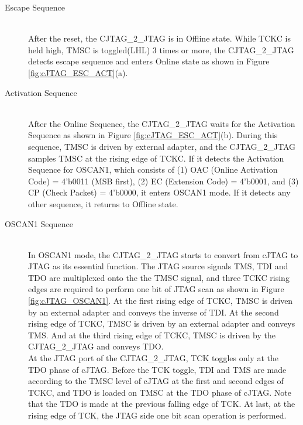 \begin{description}

    \item[Escape Sequence]\mbox{}\\
        After the reset, the CJTAG\_2\_JTAG is in Offline state. While TCKC is held high, TMSC is toggled(L\textrightarrow H\textrightarrow L) 3 times or more, the CJTAG\_2\_JTAG detects escape sequence and enters Online state as shown in Figure \ref{fig:cJTAG_ESC_ACT}(a).

    \item[Activation Sequence]\mbox{}\\
        After the Online Sequence, the CJTAG\_2\_JTAG waits for the Activation Sequence as shown in Figure \ref{fig:cJTAG_ESC_ACT}(b). During this sequence, TMSC is driven by external adapter, and the CJTAG\_2\_JTAG samples TMSC at the rising edge of TCKC. If it detects the Activation Sequence for OSCAN1, which consists of (1) OAC (Online Activation Code) = 4'b0011 (MSB first), (2) EC (Extension Code) = 4'b0001, and (3) CP (Check Packet) = 4'b0000, it enters OSCAN1 mode. If it detects any other sequence, it returns to Offline state.       

    \item[OSCAN1 Sequence]\mbox{}\\
        In OSCAN1 mode, the CJTAG\_2\_JTAG starts to convert from cJTAG to JTAG as its essential function. The JTAG source signals TMS, TDI and TDO are multiplexed onto the the TMSC signal, and three TCKC rising edges are required to perform one bit of JTAG scan as shown in Figure \ref{fig:cJTAG_OSCAN1}. At the first rising edge of TCKC, TMSC is driven by an external adapter and conveys the inverse of TDI. At the second rising edge of TCKC, TMSC is driven by an external adapter and conveys TMS. And at the third rising edge of TCKC, TMSC is driven by the CJTAG\_2\_JTAG and conveys TDO.\\
        At the JTAG port of the CJTAG\_2\_JTAG, TCK toggles only at the TDO phase of cJTAG. Before the TCK toggle, TDI and TMS are made according to the TMSC level of cJTAG at the first and second edges of TCKC, and TDO is loaded on TMSC at the TDO phase of cJTAG. Note that the TDO is made at the previous falling edge of TCK. At last, at the rising edge of TCK, the JTAG side one bit scan operation is performed.

\end{description}


